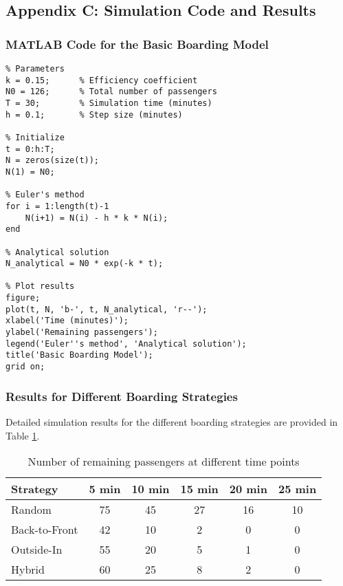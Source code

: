 \documentclass[12pt,a4paper]{article}
\begin{document}
\subsection{Appendix C: Simulation Code and Results}

\subsubsection{MATLAB Code for the Basic Boarding Model}

\begin{verbatim}
% Parameters
k = 0.15;      % Efficiency coefficient
N0 = 126;      % Total number of passengers
T = 30;        % Simulation time (minutes)
h = 0.1;       % Step size (minutes)

% Initialize
t = 0:h:T;
N = zeros(size(t));
N(1) = N0;

% Euler's method
for i = 1:length(t)-1
    N(i+1) = N(i) - h * k * N(i);
end

% Analytical solution
N_analytical = N0 * exp(-k * t);

% Plot results
figure;
plot(t, N, 'b-', t, N_analytical, 'r--');
xlabel('Time (minutes)');
ylabel('Remaining passengers');
legend('Euler''s method', 'Analytical solution');
title('Basic Boarding Model');
grid on;
\end{verbatim}

\subsubsection{Results for Different Boarding Strategies}

Detailed simulation results for the different boarding strategies are provided in Table \ref{tab:detailed_results}.

\begin{table}[H]
\centering
\begin{tabular}{|l|c|c|c|c|c|}
\hline
\textbf{Strategy} & \textbf{5 min} & \textbf{10 min} & \textbf{15 min} & \textbf{20 min} & \textbf{25 min} \\ \hline
Random & 75 & 45 & 27 & 16 & 10 \\ \hline
Back-to-Front & 42 & 10 & 2 & 0 & 0 \\ \hline
Outside-In & 55 & 20 & 5 & 1 & 0 \\ \hline
Hybrid & 60 & 25 & 8 & 2 & 0 \\ \hline
\end{tabular}
\caption{Number of remaining passengers at different time points}
\label{tab:detailed_results}
\end{table}
\end{document}
